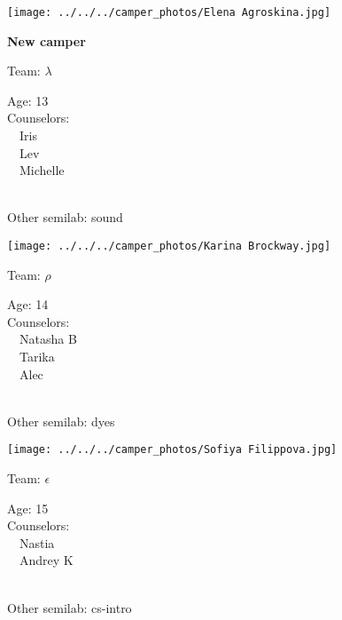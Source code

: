 \documentclass[10pt,letterpaper, landscape]{article}
\begin{document}
\verticalshiftfornextsticker
\renewcommand{\baselinestretch}{1} \begin{sticker}
\noindent\begin{minipage}{0.5\textwidth}\texttt{[image: ../../../camper\_photos/Elena Agroskina.jpg]}\end{minipage}\begin{minipage}{0.45\textwidth}
\textbf{New camper} 

Team: {\Large $\lambda$}

Age:        13\\
Counselors: \\\ \ Iris\\\ \ Lev\\\ \ Michelle\\
\end{minipage} \\ \vspace{0.07in}
Other semilab: sound
\end{sticker}
\horizontalshiftfornextsticker
\renewcommand{\baselinestretch}{1} \begin{sticker}
\noindent\begin{minipage}{0.5\textwidth}\texttt{[image: ../../../camper\_photos/Karina Brockway.jpg]}\end{minipage}\begin{minipage}{0.45\textwidth}
Team: {\Large $\rho$}

Age:        14\\
Counselors: \\\ \ Natasha B\\\ \ Tarika\\\ \ Alec\\
\end{minipage} \\ \vspace{0.07in}
Other semilab: dyes
\end{sticker}
\horizontalshiftfornextsticker
\renewcommand{\baselinestretch}{1} \begin{sticker}
\noindent\begin{minipage}{0.5\textwidth}\texttt{[image: ../../../camper\_photos/Sofiya Filippova.jpg]}\end{minipage}\begin{minipage}{0.45\textwidth}
Team: {\Large $\epsilon$}

Age:        15\\
Counselors: \\\ \ Nastia\\\ \ Andrey K\\
\end{minipage} \\ \vspace{0.07in}
Other semilab: cs-intro
\end{sticker}
\end{document}
